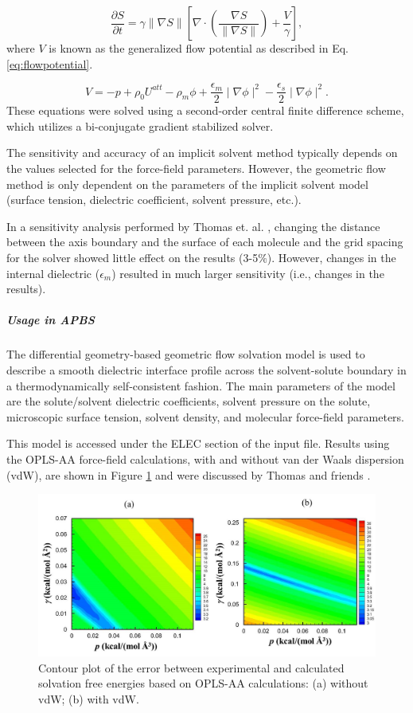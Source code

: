 \documentclass[journal=jpcbfk, manuscript=article]{achemso}
\begin{document}
\begin{equation}\label{eq:NLpde}
\frac{\partial S}{\partial t}=\gamma\parallel\nabla S\parallel\left[\nabla\cdot\left(\frac{\nabla S}{\parallel\nabla S\parallel}\right)+\frac{V}{\gamma}\right],
\end{equation}
where $V$ is known as the generalized flow potential as described in Eq. \ref{eq:flowpotential}. 

\begin{equation}\label{eq:flowpotential}
V=-p+\rho_0U^{att}-\rho_m\phi+\frac{\epsilon_m}{2}\mid\nabla\phi\mid^2-\frac{\epsilon_s}{2}\mid\nabla\phi\mid^2.
\end{equation}
%
These equations were solved using a second-order central finite difference scheme, which utilizes a bi-conjugate gradient stabilized solver.

The sensitivity and accuracy of an implicit solvent method typically depends on the values selected for the force-field parameters. However, the geometric flow method is only dependent on the parameters of the implicit solvent model (surface tension, dielectric coefficient, solvent pressure, etc.).

In a sensitivity analysis performed by Thomas et. al. \cite{thomas2013}, changing the distance between the axis boundary and the surface of each molecule and the grid spacing for the solver showed little effect on the results (3-5$\%$). However, changes in the internal dielectric ($\epsilon_m$) resulted in much larger sensitivity (i.e., changes in the results).

\subparagraph{Usage in APBS}
The differential geometry-based geometric flow solvation model is used to describe a smooth dielectric interface profile across the solvent-solute boundary in a thermodynamically self-consistent fashion. The main parameters of the model are the solute/solvent dielectric coefficients, solvent pressure on the solute, microscopic surface tension, solvent density, and molecular force-field parameters.

This model is accessed under the ELEC section of the input file. Results using the OPLS-AA force-field calculations, with and without van der Waals dispersion (vdW), are shown in Figure \ref{fig:geoflow} and were discussed by Thomas and friends \cite{thomas2013}. 
%
\begin{figure}
	\centering
	\includegraphics[width=0.80\linewidth]{geoflow.png} 
	\caption{Contour plot of the error between experimental and calculated solvation free energies based on OPLS-AA calculations:  (a) without vdW;  (b) with vdW.}
	\label{fig:geoflow}
\end{figure}
\end{document}

